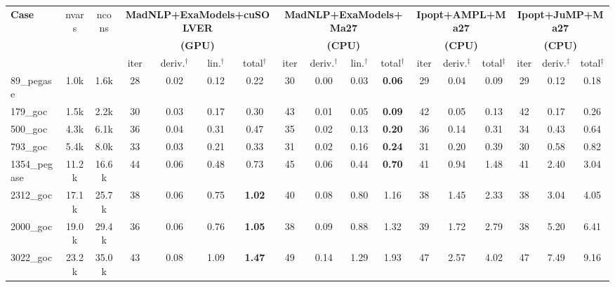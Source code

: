 \begin{tabular}{|l|c|c|cccc|cccc|ccc|ccc|}
  \hline
  \multirow{3}{*}{\textbf{Case}}
  & \multirow{3}{*}{nvars}
  & \multirow{3}{*}{ncons}
  & \multicolumn{4}{c|}{\textbf{MadNLP+ExaModels+cuSOLVER}}
  & \multicolumn{4}{c|}{\textbf{MadNLP+ExaModels+Ma27}}
  & \multicolumn{3}{c|}{\textbf{Ipopt+AMPL+Ma27}}
  & \multicolumn{3}{c|}{\textbf{Ipopt+JuMP+Ma27}}\\
  & & &\multicolumn{4}{c|}{\textbf{(GPU)}} &\multicolumn{4}{c|}{\textbf{(CPU)}} &\multicolumn{3}{c|}{\textbf{(CPU)}}&\multicolumn{3}{c|}{\textbf{(CPU)}}
  \\
  \cline{4-17}
  & & 
  & iter & deriv.$^\dag$ & lin.$^\dag$ & total$^\dag$
  & iter & deriv.$^\dag$ & lin.$^\dag$ & total$^\dag$
  & iter & deriv.$^\ddag$ & total$^\ddag$
  & iter & deriv.$^\ddag$ & total$^\ddag$
  \\
  \hline
89\_pegase 
&   1.0k
&   1.6k
& 28 
&  0.02
&  0.12
&  0.22
& 30 
&  0.00
&  0.03
& \bf{ 0.06}
& 29 
&  0.04
&  0.09
& 29 
&  0.12
&  0.18
\\

179\_goc 
&   1.5k
&   2.2k
& 30 
&  0.03
&  0.17
&  0.30
& 43 
&  0.01
&  0.05
& \bf{ 0.09}
& 42 
&  0.05
&  0.13
& 42 
&  0.17
&  0.26
\\

500\_goc 
&   4.3k
&   6.1k
& 36 
&  0.04
&  0.31
&  0.47
& 35 
&  0.02
&  0.13
& \bf{ 0.20}
& 36 
&  0.14
&  0.31
& 34 
&  0.43
&  0.64
\\

793\_goc 
&   5.4k
&   8.0k
& 33 
&  0.03
&  0.21
&  0.33
& 31 
&  0.02
&  0.16
& \bf{ 0.24}
& 31 
&  0.20
&  0.39
& 30 
&  0.58
&  0.82
\\

1354\_pegase 
&  11.2k
&  16.6k
& 44 
&  0.06
&  0.48
&  0.73
& 45 
&  0.06
&  0.44
&  {\bf 0.70}
& 41 
&  0.94
&  1.48
& 41 
&  2.40
&  3.04
\\
\hline
2312\_goc 
&  17.1k
&  25.7k
& 38 
&  0.06
&  0.75
& \bf{ 1.02}
& 40 
&  0.08
&  0.80
&  1.16
& 38 
&  1.45
&  2.33
& 38 
&  3.04
&  4.05
\\

2000\_goc 
&  19.0k
&  29.4k
& 36 
&  0.06
&  0.76
& \bf{ 1.05}
& 38 
&  0.09
&  0.88
&  1.32
& 39 
&  1.72
&  2.79
& 38 
&  5.20
&  6.41
\\

3022\_goc 
&  23.2k
&  35.0k
& 43 
&  0.08
&  1.09
& \bf{ 1.47}
& 49 
&  0.14
&  1.29
&  1.93
& 47 
&  2.57
&  4.02
& 47 
&  7.49
&  9.16
\\


\end{tabular}
